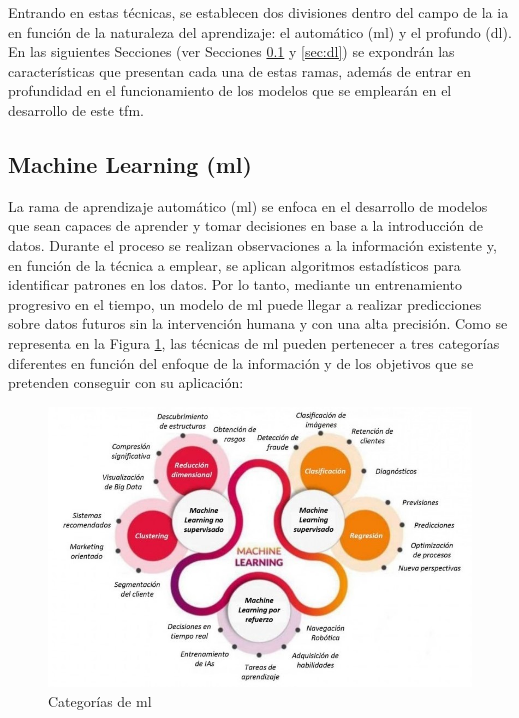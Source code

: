 \vspace{3mm}

Entrando en estas técnicas, se establecen dos divisiones dentro del campo de la \gls{ia} en función de la naturaleza del aprendizaje: el automático (\acrfull{ml}) y el profundo (\acrfull{dl}). En las siguientes Secciones (ver Secciones \ref{sec:ml} y \ref{sec:dl}) se expondrán las características que presentan cada una de estas ramas, además de entrar en profundidad en el funcionamiento de los modelos que se emplearán en el desarrollo de este \gls{tfm}.

\subsection{Machine Learning (\acrshort{ml})}
\label{sec:ml}

La rama de aprendizaje automático (\acrfull{ml}) se enfoca en el desarrollo de modelos que sean capaces de aprender y tomar decisiones en base a la introducción de datos. Durante el proceso se realizan observaciones a la información existente y, en función de la técnica a emplear, se aplican algoritmos estadísticos para identificar patrones en los datos. Por lo tanto, mediante un entrenamiento progresivo en el tiempo, un modelo de \gls{ml} puede llegar a realizar predicciones sobre datos futuros sin la intervención humana y con una alta precisión. Como se representa en la Figura \ref{fig:ml}, las técnicas de \gls{ml} pueden pertenecer a tres categorías diferentes en función del enfoque de la información y de los objetivos que se pretenden conseguir con su aplicación: \cite{mlcat} \cite{iageeks} \cite{mltlf}

\vspace{3mm}

\begin{figure}[h!]
    \centering
    \includegraphics[width=1\textwidth]{img/teoria/ml.jpeg}
    \caption{Categorías de \acrshort{ml} \cite{metal}}
    \label{fig:ml}
\end{figure}

